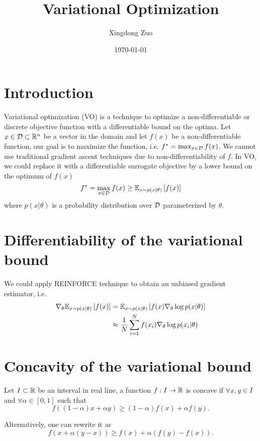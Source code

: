 \documentclass{article}
\title{Variational Optimization \cite{staines2012variational}}
\author{Xingdong Zuo}
\affil[]{IDSIA, Switzerland}
\date{\today}
\begin{document}
\maketitle

\section{Introduction}
Variational optimization (VO) is a technique to optimize a non-differentiable or discrete objective function with a differentiable bound on the optima. Let $x\in\ccD\subset\bbR^n$ be a vector in the domain and let $f(x)$ be a non-differentiable function, our goal is to maximize the function, i.e. $f^* = \max_{x\in\ccD} f(x)$. We cannot use traditional gradient ascent techniques due to non-differentiability of $f$. In VO, we could replace it with a differentiable surrogate objective by a lower bound on the optimum of $f(x)$
\begin{equation}
    f^* = \max_{x\in\ccD} f(x) \ge \Exp{f(x)}{x\sim p(x|\theta)}
\end{equation}
where $p(x|\theta)$ is a probability distribution over $\ccD$ parameterized by $\theta$. 

\section{Differentiability of the variational bound}
We could apply REINFORCE technique to obtain an unbiased gradient estimator, i.e. 
\begin{align}
    \grad_{\theta}\Exp{f(x)}{x\sim p(x|\theta)} 
    &= \Exp{f(x)\grad_{\theta}\log p(x|\theta)}{x\sim p(x|\theta)} \\
    &\approx \avgsum{i}{1}{N}f(x_i)\grad_{\theta}\log p(x_i|\theta)
\end{align}

\section{Concavity of the variational bound}
\begin{definition}
    Let $I\subset\bbR$ be an interval in real line, a function $f: I\to\bbR$ is concave if $\forall x, y\in I$ and $\forall \alpha\in[0, 1]$ such that
    \begin{equation}
        f((1-\alpha)x + \alpha y) \ge (1-\alpha)f(x) + \alpha f(y). 
    \end{equation}
\end{definition}
Alternatively, one can rewrite it as
\begin{equation}
    f(x + \alpha(y - x)) \ge f(x) + \alpha(f(y) - f(x)). 
\end{equation}
\end{document}
